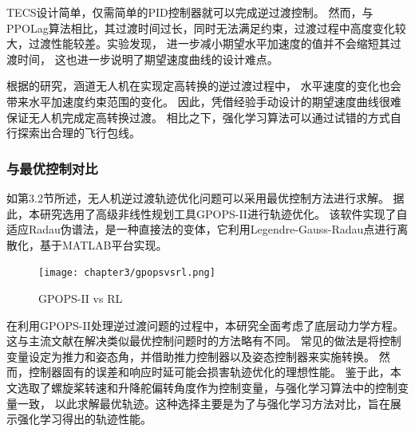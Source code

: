 TECS设计简单，仅需简单的PID控制器就可以完成逆过渡控制。
然而，与PPOLag算法相比，其过渡时间过长，同时无法满足约束，过渡过程中高度变化较大，过渡性能较差。实验发现，
进一步减小期望水平加速度的值并不会缩短其过渡时间，
这也进一步说明了期望速度曲线的设计难点。

根据\cite{cheng2022transition}的研究，涵道无人机在实现定高转换的逆过渡过程中，
水平速度的变化也会带来水平加速度约束范围的变化。
因此，凭借经验手动设计的期望速度曲线很难保证无人机完成定高转换过渡。
相比之下，强化学习算法可以通过试错的方式自行探索出合理的飞行包线。

\subsubsection{与最优控制对比}


如第3.2节所述，无人机逆过渡轨迹优化问题可以采用最优控制方法进行求解。
据此，本研究选用了高级非线性规划工具GPOPS-II\cite{patterson2014gpops}进行轨迹优化。
该软件实现了自适应Radau伪谱法，是一种直接法的变体，它利用Legendre-Gauss-Radau点进行离散化，基于MATLAB平台实现。
\begin{figure}[htbp]
    \centering
    \texttt{[image: chapter3/gpopsvsrl.png]}
    \caption{\label{fig:gpops}GPOPS-II vs RL}
    \label{fig:gpops}
\end{figure}

在利用GPOPS-II处理逆过渡问题的过程中，本研究全面考虑了底层动力学方程。
这与主流文献在解决类似最优控制问题时的方法略有不同。
常见的做法是将控制变量设定为推力和姿态角，并借助推力控制器以及姿态控制器来实施转换。
然而，控制器固有的误差和响应时延可能会损害轨迹优化的理想性能。
鉴于此，本文选取了螺旋桨转速和升降舵偏转角度作为控制变量，与强化学习算法中的控制变量一致，
以此求解最优轨迹。这种选择主要是为了与强化学习方法对比，旨在展示强化学习得出的轨迹性能。

